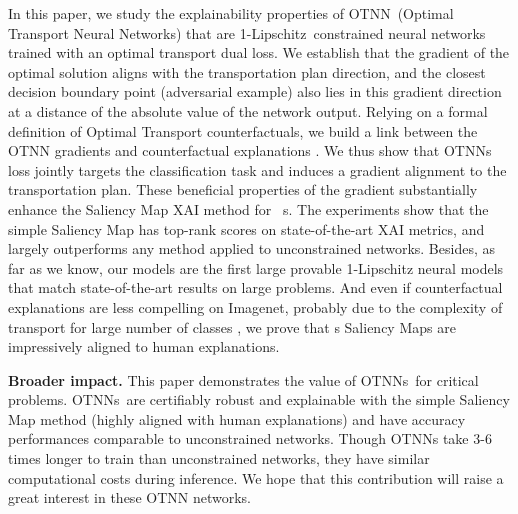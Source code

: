 In this paper, we study the explainability properties of OTNN~(Optimal Transport Neural Networks) 
that are 1-Lipschitz~constrained neural networks trained with an optimal transport dual loss. 
We establish that the gradient of the optimal solution aligns with the transportation plan direction,
and the closest decision boundary point (adversarial example) also lies in this gradient direction at a distance of the absolute value of the network output.  
Relying on a formal definition of Optimal Transport counterfactuals, we build a link between the OTNN gradients and counterfactual explanations
. We thus show that
OTNNs loss jointly targets the classification task and induces a gradient alignment to the transportation plan. 
These beneficial properties of the gradient substantially enhance the Saliency Map XAI method for \otnn~s.
The experiments show that the simple Saliency Map has top-rank scores on state-of-the-art XAI metrics, and largely outperforms any method applied to unconstrained networks. 
Besides, as far as we know, our models are the first large provable 1-Lipschitz neural models that match state-of-the-art results on large problems.
And even if counterfactual explanations are less compelling on Imagenet, probably due to the complexity of transport for 
large number of classes
, we prove that \otnn s Saliency Maps are impressively aligned to human explanations. 


\textbf{Broader impact.} This paper demonstrates the value of OTNNs~for critical problems. OTNNs~are certifiably robust and explainable with the simple Saliency Map method (highly aligned with human explanations) and have accuracy performances comparable to unconstrained networks.%
Though OTNNs take 3-6 times longer to train than unconstrained networks, they have similar computational costs during inference.
We hope that this contribution will raise a great interest in these OTNN networks.

